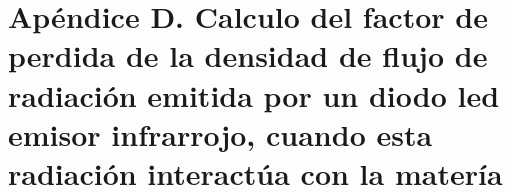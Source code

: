 
\section{Ap\'endice D. Calculo del factor de perdida de la densidad de flujo de radiaci\'on emitida por un diodo led emisor infrarrojo, cuando esta radiaci\'on interact\' ua con la mater{\'i}a}
\label{app:appD}






